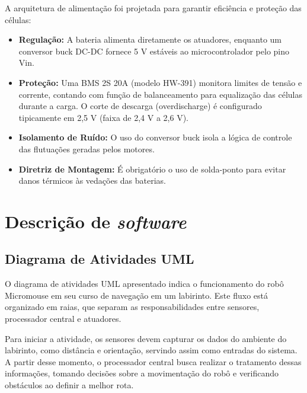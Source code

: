 A arquitetura de alimentação foi projetada para garantir eficiência e proteção das células:
\begin{itemize}
    \item \textbf{Regulação:} A bateria alimenta diretamente os atuadores, enquanto um conversor buck DC-DC fornece 5 V estáveis ao microcontrolador pelo pino Vin.
    \item \textbf{Proteção:} Uma BMS 2S 20A (modelo HW-391) monitora limites de tensão e corrente, contando com função de balanceamento para equalização das células durante a carga. O corte de descarga (overdischarge) é configurado tipicamente em 2,5 V (faixa de 2,4 V a 2,6 V).
    \item \textbf{Isolamento de Ruído:} O uso do conversor buck isola a lógica de controle das flutuações geradas pelos motores.
    \item \textbf{Diretriz de Montagem:} É obrigatório o uso de solda-ponto para evitar danos térmicos às vedações das baterias.
\end{itemize}


\section{Descrição de \textit{software}}


\subsection{Diagrama de Atividades UML}

O diagrama de atividades UML apresentado indica o funcionamento do robô Micromouse em seu curso de navegação em um labirinto. Este fluxo está organizado em raias, que separam as responsabilidades entre sensores, processador central e atuadores. 

Para iniciar a atividade, os sensores devem capturar os dados do ambiente do labirinto, como distância e orientação, servindo assim como entradas do sistema. A partir desse momento, o processador central busca realizar o tratamento dessas informações, tomando decisões sobre a movimentação do robô e verificando obstáculos ao definir a melhor rota.

